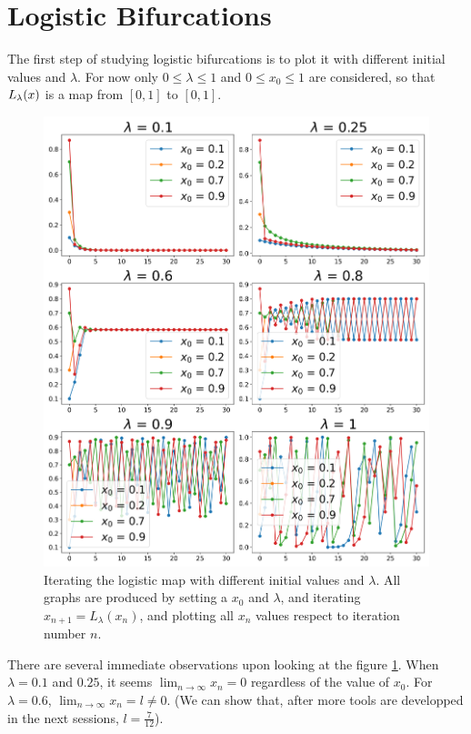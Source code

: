 \section{Logistic Bifurcations}

The first step of studying logistic bifurcations is to plot it with different initial values and $\lambda$. 
For now only $0 \leq \lambda \leq 1$ and $0 \leq x_0 \leq 1$ are considered, so that $L_{\lambda}(x)$ is a map from $[0,1]$ to $[0,1]$. 

\begin{figure}[htbp]
	\centering
	\label{fig:various_iter_logistic}
	\includegraphics[width=\textwidth]{./figures/various_iterating_logistic_map.png}
	\caption{Iterating the logistic map with different initial values and $\lambda$. All graphs are produced by setting a $x_0$ and $\lambda$, and iterating $x_{n+1} = L_{\lambda}(x_n)$, and plotting all $x_n$ values respect to iteration number $n$.}
\end{figure}

There are several immediate observations upon looking at the figure \ref{fig:various_iter_logistic}.
When $\lambda = 0.1$ and $0.25$, it seems $\lim_{n \rightarrow \infty} x_n = 0$ regardless of the value of $x_0$.
For $\lambda = 0.6$, $\lim_{n \rightarrow \infty} x_n = l \neq 0$. 
(We can show that, after more tools are developped in the next sessions, $l = \frac{7}{12}$). 

